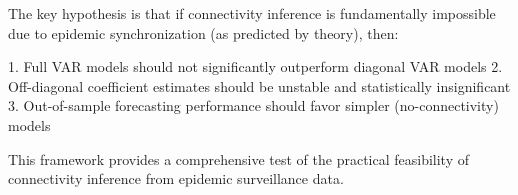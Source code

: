 The key hypothesis is that if connectivity inference is fundamentally impossible due to epidemic synchronization (as predicted by theory), then:

1. Full VAR models should not significantly outperform diagonal VAR models
2. Off-diagonal coefficient estimates should be unstable and statistically insignificant  
3. Out-of-sample forecasting performance should favor simpler (no-connectivity) models

This framework provides a comprehensive test of the practical feasibility of connectivity inference from epidemic surveillance data.

